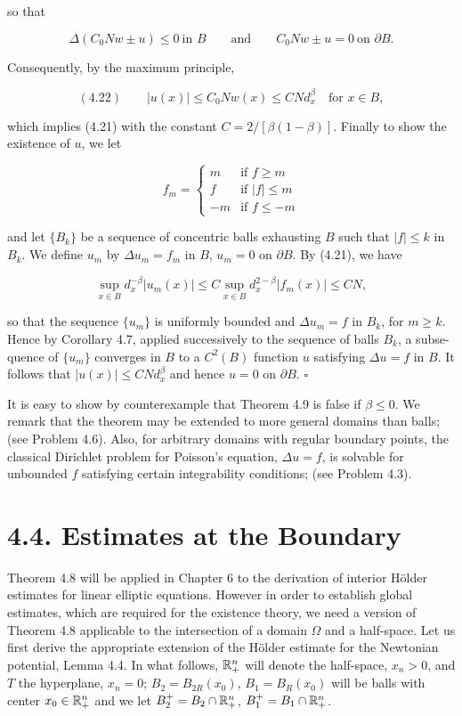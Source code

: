 so that

\[
\Delta(C_0Nw\pm u)\le 0\ \text{in } B \qquad \text{and} \qquad C_0Nw\pm u=0 \ \text{on } \partial B.
\]

Consequently, by the maximum principle,

\[
(4.22)\qquad |u(x)|\le C_0Nw(x)\le CN d_x^\beta \quad \text{for } x\in B,
\]

which implies (4.21) with the constant $C=2/[\beta(1-\beta)]$.
Finally to show the existence of $u$, we let

\[
f_m=
\begin{cases}
m & \text{if } f\ge m \\
f & \text{if } |f|\le m \\
-m & \text{if } f\le -m
\end{cases}
\]

and let $\{B_k\}$ be a sequence of concentric balls exhausting $B$ such that $|f|\le k$ in
$B_k$. We define $u_m$ by $\Delta u_m=f_m$ in $B$, $u_m=0$ on $\partial B$.
By (4.21), we have

\[
\sup_{x\in B} d_x^{-\beta}|u_m(x)|\le C\sup_{x\in B} d_x^{2-\beta}|f_m(x)|\le CN,
\]

so that the sequence $\{u_m\}$ is uniformly bounded and $\Delta u_m=f$ in $B_k$, for $m\ge k$.
Hence by Corollary 4.7, applied successively to the sequence of balls $B_k$, a subse-
quence of $\{u_m\}$ converges in $B$ to a $C^2(B)$ function $u$ satisfying $\Delta u=f$ in $B$. It
follows that $|u(x)|\le CN d_x^\beta$ and hence $u=0$ on $\partial B$. $\square$

It is easy to show by counterexample that Theorem 4.9 is false if $\beta\le 0$. We
remark that the theorem may be extended to more general domains than balls;
(see Problem 4.6). Also, for arbitrary domains with regular boundary points, the
classical Dirichlet problem for Poisson's equation, $\Delta u=f$, is solvable for unbounded
$f$ satisfying certain integrability conditions; (see Problem 4.3).



\section*{4.4. Estimates at the Boundary}

Theorem 4.8 will be applied in Chapter 6 to the derivation of interior H\"older
estimates for linear elliptic equations. However in order to establish global
estimates, which are required for the existence theory, we need a version of Theorem
4.8 applicable to the intersection of a domain $\Omega$ and a half-space. Let us first derive
the appropriate extension of the H\"older estimate for the Newtonian potential,
Lemma 4.4. In what follows, $\mathbb{R}^{n}_{+}$ will denote the half-space, $x_n>0$, and $T$ the
hyperplane, $x_n=0$; $B_2=B_{2R}(x_0)$, $B_1=B_R(x_0)$ will be balls with center $x_0\in \mathbb{R}^{n}_{+}$
and we let $B_2^+=B_2\cap \mathbb{R}^{n}_{+}$, $B_1^+=B_1\cap \mathbb{R}^{n}_{+}$.

